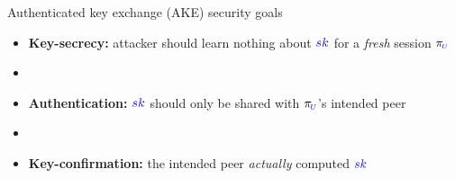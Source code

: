 \documentclass[xcolor={dvipsnames},screen, aspectratio=43,compress]{beamer}
\providecommand{\oracle}[1]{\pi_{\hspace*{-1pt}#1}}
\providecommand{\dlog}[2]{\textcolor{#1}{#2}}
\providecommand{\ub}[1]{\dlog{blue}{#1}}
\begin{document}
\begin{frame}{Authenticated key exchange (AKE) security goals}
	\begin{itemize}
		\item \textbf{Key-secrecy:} attacker should learn nothing about $\ub{sk}$ for a \emph{fresh} session {\Large$\oracle{{\scriptscriptstyle\ub{U}}}$}
								
		
		\item[]
		
		\item \textbf{Authentication:} $\ub{sk}$ should only be shared with {\Large$\oracle{{\scriptscriptstyle\ub{U}}}$}'s intended peer
		 
		\item[]
	
		\item<2-> \textbf{Key-confirmation:} the intended peer \emph{actually} computed $\ub{sk}$
		
		
%	

	
	\end{itemize}
\end{frame}


%		
%		
%		
%		
%		
%		
%		
\end{document}

